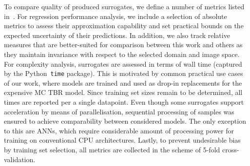 To compare quality of produced surrogates, we define a number of metrics listed
in~. For regression performance analysis, we include a
selection of absolute metrics to assess their approximation capability and set
practical bounds on the expected uncertainty of their predictions. In addition, we also track
relative measures that are better-suited for comparison between this work and others as
they maintain invariance with respect to the selected domain and image space.
For complexity analysis, surrogates are assessed in terms of wall
time (captured by the Python~\texttt{time} package). This is motivated by common practical use
cases of our work, where models are trained and used as drop-in replacements for the
expensive MC TBR model. Since training set sizes remain to be determined, all times are
reported per a single datapoint. Even though some surrogates support acceleration
by means of parallelisation, sequential processing of samples was ensured to
achieve comparability between considered models. The only exception to this are
ANNs, which require considerable amount of processing power for training on
conventional CPU architectures. Lastly, to prevent undesirable bias by training set
selection, all metrics are collected in the scheme of 5-fold cross-validation.

